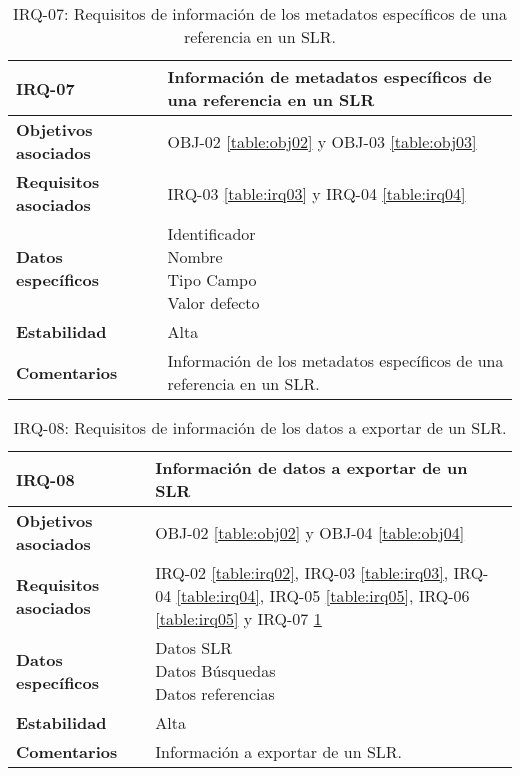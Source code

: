\begin{table}[!hbt]
	\begin{center}
		\begin{tabular}{|p{5cm}|p{10cm}|}
			\hline
			\textbf{IRQ-07} & Información de metadatos específicos de una referencia en un SLR\\
			\hline
			\textbf{Objetivos asociados} & OBJ-02 \ref{table:obj02} y OBJ-03 \ref{table:obj03}\\
			\hline
			\textbf{Requisitos asociados} & IRQ-03 \ref{table:irq03} y IRQ-04 \ref{table:irq04}\\
			\hline
			\textbf{Datos específicos} & \shortstack[l]{Identificador \\ Nombre \\ Tipo Campo \\ Valor defecto} \\
			\hline
			\textbf{Estabilidad} & Alta\\
			\hline
			\textbf{Comentarios} & Información de los metadatos específicos de una referencia en un SLR.\\
			\hline
		\end{tabular}
		\caption{IRQ-07: Requisitos de información de los metadatos específicos de una referencia en un SLR.}
		\label{table:irq07}
	\end{center}
\end{table}

\begin{table}[!hbt]
	\begin{center}
		\begin{tabular}{|p{5cm}|p{10cm}|}
			\hline
			\textbf{IRQ-08} & Información de datos a exportar de un SLR\\
			\hline
			\textbf{Objetivos asociados} & OBJ-02 \ref{table:obj02} y OBJ-04 \ref{table:obj04}\\
			\hline
			\textbf{Requisitos asociados} & IRQ-02 \ref{table:irq02}, IRQ-03 \ref{table:irq03}, IRQ-04 \ref{table:irq04}, IRQ-05 \ref{table:irq05}, IRQ-06 \ref{table:irq05} y IRQ-07 \ref{table:irq07} \\
			\hline
			\textbf{Datos específicos} & \shortstack[l]{Datos SLR \\ Datos Búsquedas \\ Datos referencias} \\
			\hline
			\textbf{Estabilidad} & Alta\\
			\hline
			\textbf{Comentarios} & Información a exportar de un SLR.\\
			\hline
		\end{tabular}
		\caption{IRQ-08: Requisitos de información de los datos a exportar de un SLR.}
		\label{table:irq08}
	\end{center}
\end{table}

